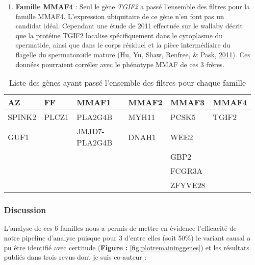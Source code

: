 \documentclass[12pt,twoside]{reedthesis}
\providecommand{\tightlist}{%
  \setlength{\itemsep}{0pt}\setlength{\parskip}{0pt}}
\theoremstyle{definition}
\theoremstyle{definition}
\theoremstyle{remark}
\begin{document}
  \begin{enumerate}
  \def\labelenumi{\arabic{enumi}.}
  \setcounter{enumi}{5}
  \tightlist
  \item
    \textbf{Famille MMAF4} : Seul le gène \emph{TGIF2} a passé l'ensemble
    des filtres pour la famille MMAF4. L'expression ubiquitaire de ce gène
    n'en font pas un candidat idéal. Cependant une étude de 2011 effectuée
    sur le wallaby décrit que la protéine TGIF2 localise spécifiquement
    dans le cytoplasme du spermatide, ainsi que dans le corps résiduel et
    la pièce intermédiaire du flagelle du spermatozoïde mature (Hu, Yu,
    Shaw, Renfree, \& Pask, \protect\hyperlink{ref-Hu2011}{2011}). Ces
    données pourraient corréler avec le phénotype MMAF de ces 3 frères.
  \end{enumerate}
  
  \begin{longtable}[t]{llllll}
  \caption{\label{tab:tablegene}Liste des gènes ayant passé l'ensemble des filtres pour chaque famille}\\
  \toprule
  AZ & FF & MMAF1 & MMAF2 & MMAF3 & MMAF4\\
  \midrule
  SPINK2 & PLCZ1 & PLA2G4B & MYH11 & PCSK5 & TGIF2\\
  GUF1 &  & JMJD7-PLA2G4B & DNAH1 & WEE2 & \\
   &  &  &  & GBP2 & \\
   &  &  &  & FCGR3A & \\
   &  &  &  & ZFYVE28 & \\
  \bottomrule
  \end{longtable}
  
  \newpage
  
  \subsubsection{Discussion}\label{discussion}
  
  L'analyse de ces 6 familles nous a permis de mettre en évidence
  l'efficacité de notre pipeline d'analyse puisque pour 3 d'entre elles
  (soit 50\%) le variant causal a pu être identifié avec certitude
  (\textbf{Figure : }\ref{fig:plotremaininggenes}) et les résultats
  publiés dans trois revus dont je suis co-auteur :
  
\end{document}
